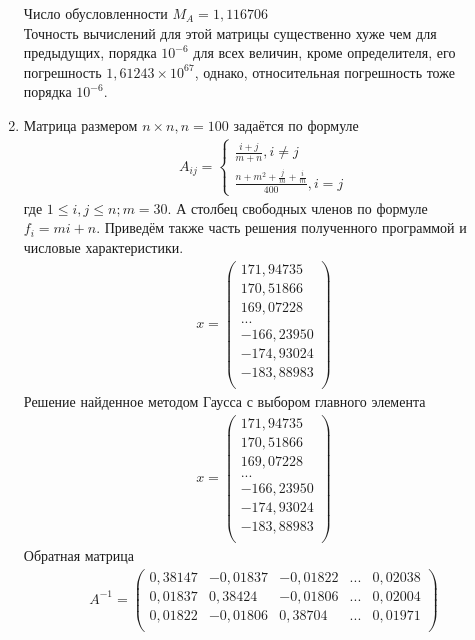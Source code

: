 \documentclass[a4paper,12pt,titlepage,finall]{article}
\begin{document}
\begin{enumerate}
Число обусловленности $M_A = 1,116706$\\
Точность вычислений для этой матрицы существенно хуже чем для предыдущих, порядка $10^{-6}$ для всех величин, кроме определителя, его погрешность $1,61243 \times 10^{67}$, однако, относительная погрешность тоже порядка $10^{-6}$.
\item
Матрица размером $n \times n, n = 100$ задаётся по формуле
\begin{align}
A_{ij} = \left\{
\begin{array}{ll}
\frac{i+j}{m+n}, i \neq j\\
\frac{n + m^2 + \frac{j}{m} + \frac{i}{m}}{400}, i = j
\end{array}
\right.
\end{align}
где $1 \leq i,j \leq n; m = 30$. А столбец свободных членов по формуле $f_i = mi + n$. Приведём также часть решения полученного программой и числовые характеристики.
\begin{align*}
x = \begin{pmatrix}
171,94735 \\
 170,51866 \\
 169,07228 \\
   ...\\
-166,23950 \\
-174,93024 \\
-183,88983 \\
\end{pmatrix}
\end{align*}
Решение найденное методом Гаусса с выбором главного элемента
\begin{align*}
x = \begin{pmatrix}
171,94735 \\
 170,51866 \\
 169,07228 \\
   ...\\
-166,23950 \\
-174,93024 \\
-183,88983 \\
\end{pmatrix}
\end{align*}
Обратная матрица
\begin{align*}
A^{-1} = \begin{pmatrix}
    0,38147&    -0,01837&    -0,01822& ... &     0,02038 \\
	0,01837&     0,38424&    -0,01806& ... &     0,02004 \\
	0,01822&    -0,01806&     0,38704& ... &     0,01971 \\

\end{pmatrix}
\end{align*}
\end{enumerate}
\end{document}
